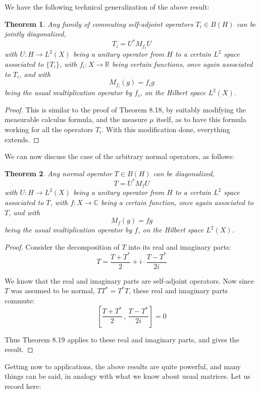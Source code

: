 \documentclass[12pt]{amsbook}
\newtheorem{theorem}{Theorem}[chapter]
\begin{document}
We have the following technical generalization of the above result:

\begin{theorem}
Any family of commuting self-adjoint operators $T_i\in B(H)$ can be jointly diagonalized,
$$T_i=U^*M_{f_i}U$$
with $U:H\to L^2(X)$ being a unitary operator from $H$ to a certain $L^2$ space associated to $\{T_i\}$, with $f_i:X\to\mathbb R$ being certain functions, once again associated to $T_i$, and with
$$M_{f_i}(g)=f_ig$$
being the usual multiplication operator by $f_i$, on the Hilbert space $L^2(X)$.
\end{theorem}

\begin{proof}
This is similar to the proof of Theorem 8.18, by suitably modifying the measurable calculus formula, and the measure $\mu$ itself, as to have this formula working for all the operators $T_i$. With this modification done, everything extends.
\end{proof}

We can now discuss the case of the arbitrary normal operators, as follows:

\begin{theorem}
Any normal operator $T\in B(H)$ can be diagonalized,
$$T=U^*M_fU$$
with $U:H\to L^2(X)$ being a unitary operator from $H$ to a certain $L^2$ space associated to $T$, with $f:X\to\mathbb C$ being a certain function, once again associated to $T$, and with
$$M_f(g)=fg$$
being the usual multiplication operator by $f$, on the Hilbert space $L^2(X)$.
\end{theorem}

\begin{proof}
Consider the decomposition of $T$ into its real and imaginary parts:
$$T=\frac{T+T^*}{2}+i\cdot\frac{T-T^*}{2i}$$

We know that the real and imaginary parts are self-adjoint operators. Now since $T$ was assumed to be normal, $TT^*=T^*T$, these real and imaginary parts commute:
$$\left[\frac{T+T^*}{2}\,,\,\frac{T-T^*}{2i}\right]=0$$

Thus Theorem 8.19 applies to these real and imaginary parts, and gives the result.
\end{proof}

Getting now to applications, the above results are quite powerful, and many things can be said, in analogy with what we know about usual matrices. Let us record here:

\end{document}
